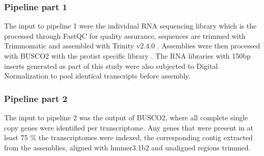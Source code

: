 \documentclass[12pt]{article}
\begin{document}
\subsubsection*{Pipeline part 1}
The input to pipeline 1 were the individual RNA sequencing library which is the processed through FastQC \cite{fastqc} for quality assurance, sequences are trimmed with Trimmomatic \cite{bolger2014trimmomatic} and assembled with Trinity v2.4.0 \cite{haas2013novo}. 
Assemblies were then processed with BUSCO2 with the protist specific library \cite{simao2015busco}.
The RNA libraries with 150bp inserts generated as part of this study were also subjected to Digital Normalization \cite{diginorm} to pool identical transcripts before assembly.                                                                                                                                                                                                                                                                                                                                                                                                                                                                                                                                                                                                                                                                                                                                                                                                                                                                                                                                                                                                                                                                                                                                                                                                                                                                                                                                           
\subsubsection*{Pipeline part 2}
The input to pipeline 2 was the output of BUSCO2, where all complete single copy genes were identified per transcriptome. 
Any genes that were present in at least 75 \% the transcriptomes were indexed, the corresponding contig extracted from the assemblies, aligned with hmmer3.1b2 \cite{eddy2015hmmer} and unaligned regions trimmed.
\end{document}
